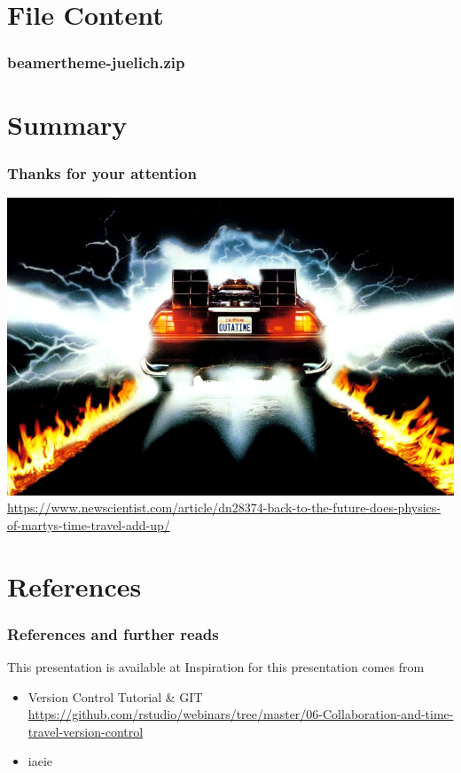 \documentclass[
t, %
10pt, %
aspectratio=1610, %
ngerman,
english,
]{beamer}
\begin{document}
\section{File Content}
\begin{frame}
	\frametitle{beamertheme-juelich.zip}
\end{frame}

\section{Summary}
\begin{frame}
    \frametitle{Thanks for your attention}
    \centering
    \includegraphics[height=0.7\textheight]{graphics/dn28374-1_800.jpg}\\
    \url{https://www.newscientist.com/article/dn28374-back-to-the-future-does-physics-of-martys-time-travel-add-up/}
\end{frame}


\section{References}
\begin{frame}
    \frametitle{References and further reads}
    This presentation is available at \url{}
    Inspiration for this presentation comes from
    \begin{itemize}
        \item Version Control Tutorial & GIT \newline \url{https://github.com/rstudio/webinars/tree/master/06-Collaboration-and-time-travel-version-control}
        \item iaeie
    \end{itemize}
\end{frame}
\end{document}
